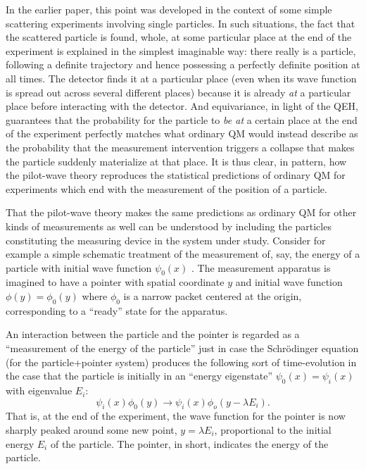 \documentclass[aps,prc,onecolumn,letterpaper,floatfix,12pt]{revtex4}
\begin{document}
In the earlier paper, this point was developed in the context of some
simple scattering experiments involving single particles.  In such situations, the
fact that the scattered particle is found, whole, at some particular
place at the end of the experiment 
is explained in the simplest imaginable way:  there really is a
particle, following a definite trajectory and hence possessing a
perfectly definite position at all times.  The detector finds it at a
particular place (even when its wave
function is spread out across several different places) because it is
already \emph{at} a particular place before interacting with the detector. 
And equivariance, in light of the QEH, guarantees that the probability for the particle to
\emph{be at} a certain place at the end of the experiment perfectly
matches what ordinary QM would instead describe as the probability that the
measurement intervention triggers a collapse that makes
the particle suddenly materialize at that place.  
It is thus clear, in pattern, how the pilot-wave theory
reproduces the statistical predictions of ordinary QM for experiments
which end with the measurement of the position of a particle.

That the pilot-wave theory makes the same predictions as ordinary QM
for other kinds of measurements as well can be understood by including
the particles constituting the measuring device in the system under
study.  Consider for example a simple
schematic treatment of the measurement of, say, the energy of a particle
with initial wave function $\psi_0(x)$ \cite{particle}.  
The measurement apparatus is imagined to have a pointer with
spatial coordinate $y$ and initial wave function $\phi(y) = \phi_0(y)$
where $\phi_0$ is a narrow packet centered at the origin, corresponding
to a ``ready'' state for the apparatus.  


An interaction between the particle and the pointer is regarded
as a ``measurement of the energy
of the particle'' just in case the Schr\"odinger equation (for the
particle+pointer system) produces the following sort of time-evolution
in the case that the particle is initially in an ``energy eigenstate''
$\psi_0(x) = \psi_i(x)$ with eigenvalue $E_i$:
\begin{equation}
\psi_i(x) \phi_0(y) \rightarrow \psi_i(x) \phi_o(y-\lambda E_i).
\end{equation}
That is, at the end of the experiment, the wave function for the
pointer is now sharply peaked around some new point, $y = \lambda
E_i$, proportional to the initial energy $E_i$ of
the particle.  The pointer, in short, indicates the energy of the particle.
\end{document}
